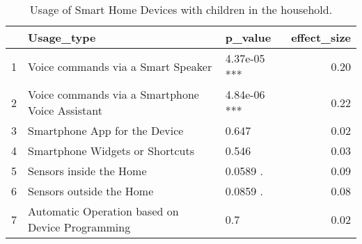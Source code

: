 \begin{table}[ht]
\centering
\begin{tabular}{rllr}
  \hline
 & Usage\_type & p\_value & effect\_size \\ 
  \hline
1 & Voice commands via a Smart Speaker & 4.37e-05 *** & 0.20 \\ 
  2 & Voice commands via a Smartphone Voice Assistant & 4.84e-06 *** & 0.22 \\ 
  3 & Smartphone App for the Device & 0.647   & 0.02 \\ 
  4 & Smartphone Widgets or Shortcuts & 0.546   & 0.03 \\ 
  5 & Sensors inside the Home & 0.0589 . & 0.09 \\ 
  6 & Sensors outside the Home & 0.0859 . & 0.08 \\ 
  7 & Automatic Operation based on Device Programming & 0.7   & 0.02 \\ 
   \hline
\end{tabular}
\caption{Usage of Smart Home Devices with children in the household.} 
\label{RQ3_H3_UsageTypeChildren}
\end{table}
